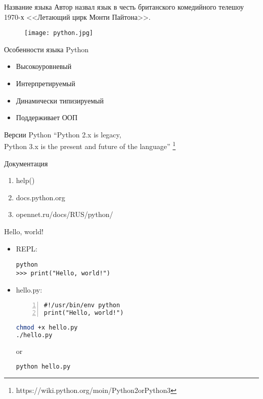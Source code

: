 \documentclass[hyperref={pdftex,unicode}]{beamer}
\begin{document}
\begin{frame}{Название языка}
  Автор назвал язык в честь британского комедийного телешоу 1970-х
  <<Летающий цирк Монти Пайтона>>.

  \begin{figure}[H]
    \texttt{[image: python.jpg]}
  \end{figure}
\end{frame}

\begin{frame}{Особенности языка Python}
  \begin{itemize}
    \item Высокоуровневый
    \item Интерпретируемый
    \item Динамически типизируемый
    \item Поддерживает ООП
  \end{itemize}
\end{frame}

\begin{frame}{Версии Python}
  \centering
  ``Python 2.x is legacy, \\
  Python 3.x is the present
  and future of the language'' \footnote[frame]{
    https://wiki.python.org/moin/Python2orPython3}
\end{frame}

\begin{frame}{Документация}
  \begin{enumerate}
    \item help()
    \item docs.python.org
    \item opennet.ru/docs/RUS/python/
  \end{enumerate}
\end{frame}

\begin{frame}[fragile]{Hello, world!}
  \begin{itemize}
  \item REPL:
    \begin{lstlisting}
python
>>> print("Hello, world!")
    \end{lstlisting}
  \item hello.py:
    \begin{lstlisting}[numbers=left]
#!/usr/bin/env python
print("Hello, world!")
    \end{lstlisting}

  \begin{minipage}{0.4\linewidth}
     \begin{lstlisting}[language=bash]
chmod +x hello.py
./hello.py
     \end{lstlisting}
   \end{minipage}
   \hfill or \hfill
   \begin{minipage}{0.4\linewidth}
     \vspace{3.5mm}
     \begin{lstlisting}[language=bash]
python hello.py
     \end{lstlisting}
   \end{minipage}

  \end{itemize}
\end{frame}
\end{document}
